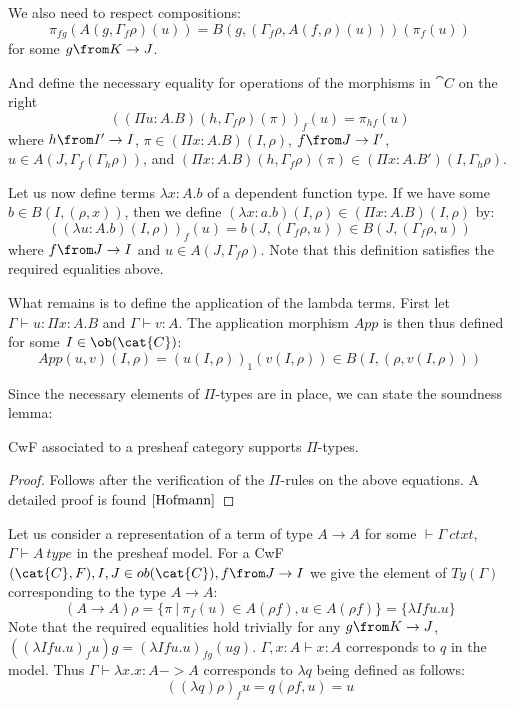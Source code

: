 We also need to respect compositions:
\[
  \pi_{fg}(A(g, \Gamma_f \rho)(u)) = B(g, (\Gamma_f \rho, A(f, \rho)(u)))(\pi_f(u))
\]
for some $g \from K \to J$.

And define the necessary equality for operations of the morphisms in $\cat{C}$
on the right
\[
  ((\Pi u: A.B)(h, \Gamma_f \rho)(\pi))_f(u) = \pi_{hf}(u)
\]
where $h \from I' \to I$, $\pi \in (\Pi x:A.B)(I, \rho)$, $f \from J \to I'$,
$u \in A(J, \Gamma_f(\Gamma_h \rho))$, and $(\Pi x: A.B)(h, \Gamma_f \rho)(\pi)
\in (\Pi x: A.B')(I, \Gamma_h \rho)$.

Let us now define terms $\lambda x: A. b$ of a dependent function type. If we
have some $b \in B(I, (\rho, x))$, then we define $(\lambda x: a.b)(I, \rho)
\in (\Pi x: A.B)(I, \rho)$ by:
\[
  ((\lambda u: A.b)(I, \rho))_f(u) = b(J, (\Gamma_f \rho, u)) \in B(J, (\Gamma_f \rho, u))
\]
where $f \from J \to I$ and $u \in A(J, \Gamma_f \rho)$. Note that this
definition satisfies the required equalities above.

What remains is to define the application of the lambda terms. First let
$\Gamma \vdash u : \Pi x:A.B$ and $\Gamma \vdash v : A$. The application
morphism $App$ is then thus defined for some $I \in \ob(\cat{C})$:
\[
  App(u, v)(I, \rho) = (u(I, \rho))_1(v(I, \rho)) \in B(I, (\rho, v(I, \rho)))
\]

Since the necessary elements of $\Pi$-types are in place, we can state the soundness lemma:
\begin{lemma}
  CwF associated to a presheaf category supports $\Pi$-types.
  \begin{proof}
    Follows after the verification of the $\Pi$-rules on the above equations. A
    detailed proof is found $\cite{Hofmann}$
  \end{proof}
\end{lemma}

\begin{example}
  Let us consider a representation of a term of type $A \to A$ for some $\vdash
  \Gamma~ctxt$, $\Gamma \vdash A~type$ in the presheaf model. For a CwF $(\cat{C}, F), I, J \in ob(\cat{C}), f \from J \to I$ we give the
  element of $\mathit{Ty}(\Gamma)$ corresponding to the type $A \to A$:
  \[
    (A \to A)\rho = \{\pi~|~\pi_f(u) \in A(\rho f), u \in A(\rho f)\} = \{\lambda I f u.u\}
  \]
  Note that the required equalities hold trivially for any $g \from K \to J$, $((\lambda
  I f u.u)_f u) g = (\lambda I f u.u)_{fg} (ug)$. $\Gamma, x : A \vdash x : A$ corresponds to $q$ in the model. Thus $\Gamma
  \vdash \lambda x.x : A -> A$ corresponds to $\lambda q$ being defined as
  follows:
  \[
    ((\lambda q) \rho)_f u = q(\rho f, u) = u
  \]
\end{example}

